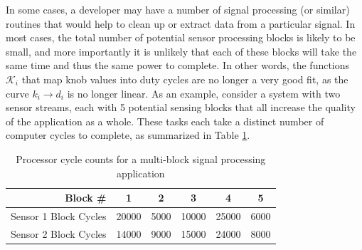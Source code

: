 In some cases, a developer may have a number of signal processing (or similar) routines that would help to clean up or extract data from a particular signal.  In most cases, the total number of potential sensor processing blocks is likely to be small, and more importantly it is unlikely that each of these blocks will take the same time and thus the same power to complete.  In other words, the functions $\mathcal{K}_i$ that map knob values into duty cycles are no longer a very good fit, as the curve $k_i\rightarrow d_i$ is no longer linear.  As an example, consider a system with two sensor streams, each with 5 potential sensing blocks that all increase the quality of the application as a whole.  These tasks each take a distinct number of computer cycles to complete, as summarized in Table \ref{tab:blocks}.
\begin{table}
\caption{\label{tab:blocks}Processor cycle counts for a multi-block signal processing application}
\centering
\begin{tabular}{r|ccccc}
\hline
Block \# & 1 & 2 & 3 & 4 & 5 \\ \hline
Sensor 1 Block Cycles & 20000 & 5000 & 10000 & 25000 & 6000 \\
Sensor 2 Block Cycles & 14000 & 9000 & 15000 & 24000 & 8000 \\ \hline
\end{tabular}
\end{table}


